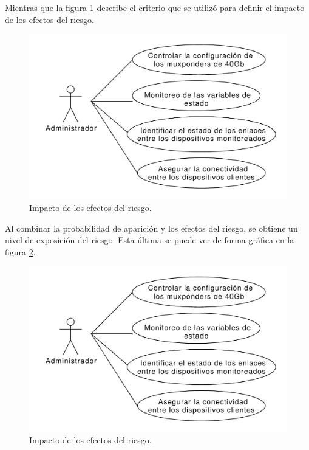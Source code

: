 Mientras que la figura \ref{fig:efectos_riesgo} describe el criterio que se utilizó para definir el impacto de los efectos del riesgo. 

\begin{figure}[H]
  \centering
  \includegraphics[scale=0.53]{Figures/caso_uso_admin.pdf}
  \caption{Impacto de los efectos del riesgo.}
  \label{fig:efectos_riesgo}
\end{figure}

Al combinar la probabilidad de aparición y los efectos del riesgo, se obtiene un nivel de exposición del riesgo. Esta última se puede ver de forma gráfica en la figura \ref{fig:niveles_riesgo}. 

\begin{figure}[H]
  \centering
  \includegraphics[scale=0.53]{Figures/caso_uso_admin.pdf}
  \caption{Impacto de los efectos del riesgo.}
  \label{fig:niveles_riesgo}
\end{figure}

